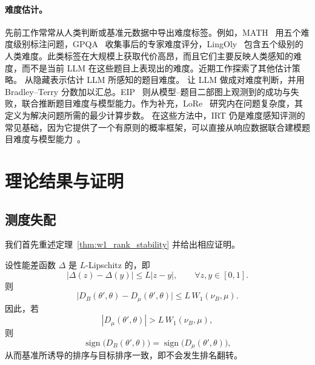 \paragraph{难度估计。} 先前工作常常从人类判断或基准元数据中导出难度标签。例如，MATH~\cite{hendrycks2021measuring} 用五个难度级别标注问题，GPQA~\cite{rein2024gpqa} 收集事后的专家难度评分，LingOly~\cite{bean2024lingoly} 包含五个级别的人类难度。此类标签在大规模上获取代价高昂，而且它们主要反映人类感知的难度，而不是当前 LLM 在这些题目上表现出的难度。近期工作探索了其他估计策略。\citep{zhu2025llm} 从隐藏表示估计 LLM 所感知的题目难度。\cite{ballon2025estimating} 让 LLM 做成对难度判断，并用 Bradley–Terry 分数加以汇总。EIP~\cite{zhang2026rankllm} 则从模型–题目二部图上观测到的成功与失败，联合推断题目难度与模型能力。作为补充，LoRe~\cite{zhang2025reasoning} 研究内在问题复杂度，其定义为解决问题所需的最少计算步数。
在这些方法中，IRT 仍是难度感知评测的常见基础，因为它提供了一个有原则的概率框架，可以直接从响应数据联合建模题目难度与模型能力~\cite{chen2025item}。

\section{理论结果与证明}
\label{sec:app_proof}

\subsection{测度失配}
\label{sec:app_proof_mismatch}

我们首先重述定理~\ref{thm:w1_rank_stability} 并给出相应证明。

\begin{theorem}[分布失配控制分数扭曲与排名稳定性]
设性能差函数 $\Delta$ 是 $L$-Lipschitz 的，即
\[
|\Delta(z)-\Delta(y)| \le L |z-y|,
\qquad \forall z,y \in [0,1].
\]
则
\[
\bigl|D_B(\theta',\theta) - D_\mu(\theta',\theta)\bigr|
\le
L\, W_1(\nu_B,\mu).
\]
因此，若
\[
|D_\mu(\theta',\theta)| > L\, W_1(\nu_B,\mu),
\]
则
\[
\operatorname{sign}\bigl(D_B(\theta',\theta)\bigr)
=
\operatorname{sign}\bigl(D_\mu(\theta',\theta)\bigr),
\]
从而基准所诱导的排序与目标排序一致，即不会发生排名翻转。
\end{theorem}

